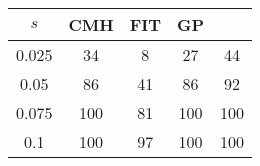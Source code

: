\centering \begin{tabular}{c|c|c|c|c}
$s$	&CMH	&FIT	&GP	&\sc{Clear}\\\hline
0.025	&34	&8	&27	&44\\
0.05	&86	&41	&86	&92\\
0.075	&100	&81	&100	&100\\
0.1	&100	&97	&100	&100\\
\end{tabular}
